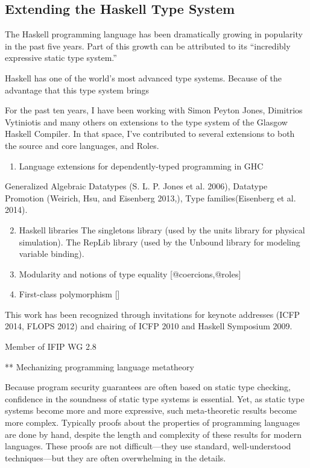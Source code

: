 \documentclass[]{article}
\begin{document}
\subsection{Extending the Haskell Type System}

The Haskell programming language has been dramatically growing in
popularity in the past five years. Part of this growth can be attributed
to its ``incredibly expressive static type system.''

Haskell has one of the world's most advanced type systems. Because of
the advantage that this type system brings

For the past ten years, I have been working with Simon Peyton Jones,
Dimitrios Vytiniotis and many others on extensions to the type system of
the Glasgow Haskell Compiler. In that space, I've contributed to several
extensions to both the source and core languages, and Roles.

\begin{enumerate}[1.]
\item
  Language extensions for dependently-typed programming in GHC
\end{enumerate}

Generalized Algebraic Datatypes (S. L. P. Jones et al. 2006), Datatype
Promotion (Weirich, Hsu, and Eisenberg 2013,), Type families(Eisenberg
et al. 2014).

\begin{enumerate}[1.]
\setcounter{enumi}{1}
\item
  Haskell libraries The singletons library (used by the units library
  for physical simulation). The RepLib library (used by the Unbound
  library for modeling variable binding).
\item
  Modularity and notions of type equality {[}@coercions,@roles{]}
\item
  First-class polymorphism {[}{]}
\end{enumerate}

This work has been recognized through invitations for keynote addresses
(ICFP 2014, FLOPS 2012) and chairing of ICFP 2010 and Haskell Symposium
2009.

Member of IFIP WG 2.8

** Mechanizing programming language metatheory

Because program security guarantees are often based on static type
checking, confidence in the soundness of static type systems is
essential. Yet, as static type systems become more and more expressive,
such meta-theoretic results become more complex. Typically proofs about
the properties of programming languages are done by hand, despite the
length and complexity of these results for modern languages. These
proofs are not difficult---they use standard, well-understood
techniques---but they are often overwhelming in the details.
\end{document}
